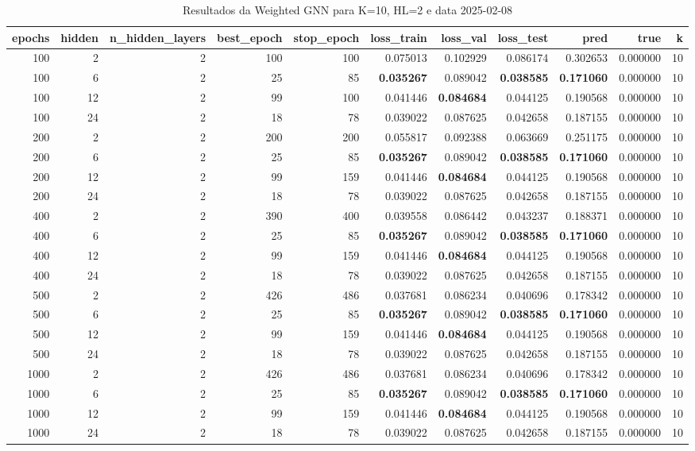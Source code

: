 \begin{table}
\caption{Resultados da Weighted GNN para K=10, HL=2 e data 2025-02-08}
\label{tab:weighted_gnn_results_k10_hl2_d20250208}
\begin{tabular}{rrrrrrrrrrr}
\toprule
epochs & hidden & n\_hidden\_layers & best\_epoch & stop\_epoch & loss\_train & loss\_val & loss\_test & pred & true & k \\
\midrule
100 & 2 & 2 & 100 & 100 & 0.075013 & 0.102929 & 0.086174 & 0.302653 & 0.000000 & 10 \\
100 & 6 & 2 & 25 & 85 & \textbf{0.035267} & 0.089042 & \textbf{0.038585} & \textbf{0.171060} & 0.000000 & 10 \\
100 & 12 & 2 & 99 & 100 & 0.041446 & \textbf{0.084684} & 0.044125 & 0.190568 & 0.000000 & 10 \\
100 & 24 & 2 & 18 & 78 & 0.039022 & 0.087625 & 0.042658 & 0.187155 & 0.000000 & 10 \\
200 & 2 & 2 & 200 & 200 & 0.055817 & 0.092388 & 0.063669 & 0.251175 & 0.000000 & 10 \\
200 & 6 & 2 & 25 & 85 & \textbf{0.035267} & 0.089042 & \textbf{0.038585} & \textbf{0.171060} & 0.000000 & 10 \\
200 & 12 & 2 & 99 & 159 & 0.041446 & \textbf{0.084684} & 0.044125 & 0.190568 & 0.000000 & 10 \\
200 & 24 & 2 & 18 & 78 & 0.039022 & 0.087625 & 0.042658 & 0.187155 & 0.000000 & 10 \\
400 & 2 & 2 & 390 & 400 & 0.039558 & 0.086442 & 0.043237 & 0.188371 & 0.000000 & 10 \\
400 & 6 & 2 & 25 & 85 & \textbf{0.035267} & 0.089042 & \textbf{0.038585} & \textbf{0.171060} & 0.000000 & 10 \\
400 & 12 & 2 & 99 & 159 & 0.041446 & \textbf{0.084684} & 0.044125 & 0.190568 & 0.000000 & 10 \\
400 & 24 & 2 & 18 & 78 & 0.039022 & 0.087625 & 0.042658 & 0.187155 & 0.000000 & 10 \\
500 & 2 & 2 & 426 & 486 & 0.037681 & 0.086234 & 0.040696 & 0.178342 & 0.000000 & 10 \\
500 & 6 & 2 & 25 & 85 & \textbf{0.035267} & 0.089042 & \textbf{0.038585} & \textbf{0.171060} & 0.000000 & 10 \\
500 & 12 & 2 & 99 & 159 & 0.041446 & \textbf{0.084684} & 0.044125 & 0.190568 & 0.000000 & 10 \\
500 & 24 & 2 & 18 & 78 & 0.039022 & 0.087625 & 0.042658 & 0.187155 & 0.000000 & 10 \\
1000 & 2 & 2 & 426 & 486 & 0.037681 & 0.086234 & 0.040696 & 0.178342 & 0.000000 & 10 \\
1000 & 6 & 2 & 25 & 85 & \textbf{0.035267} & 0.089042 & \textbf{0.038585} & \textbf{0.171060} & 0.000000 & 10 \\
1000 & 12 & 2 & 99 & 159 & 0.041446 & \textbf{0.084684} & 0.044125 & 0.190568 & 0.000000 & 10 \\
1000 & 24 & 2 & 18 & 78 & 0.039022 & 0.087625 & 0.042658 & 0.187155 & 0.000000 & 10 \\
\bottomrule
\end{tabular}
\end{table}

